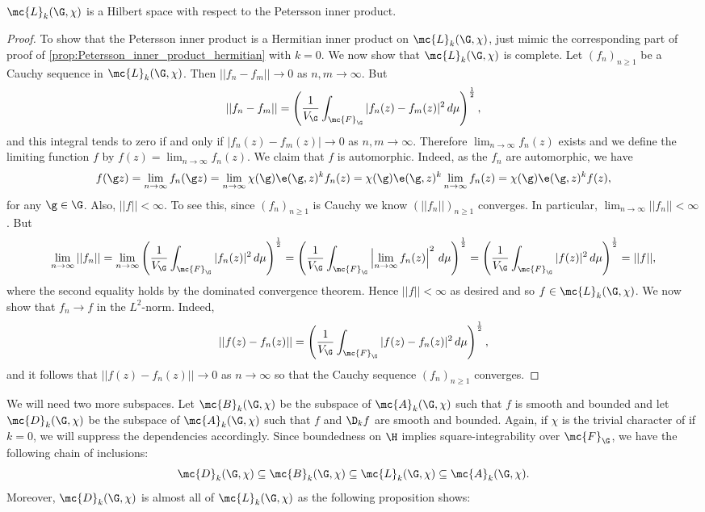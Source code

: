     \begin{proposition}
      $\mc{L}_{k}(\G,\chi)$ is a Hilbert space with respect to the Petersson inner product.
    \end{proposition}
    \begin{proof}
      To show that the Petersson inner product is a Hermitian inner product on $\mc{L}_{k}(\G,\chi)$, just mimic the corresponding part of proof of \cref{prop:Petersson_inner_product_hermitian} with $k = 0$. We now show that $\mc{L}_{k}(\G,\chi)$ is complete. Let $(f_{n})_{n \ge 1}$ be a Cauchy sequence in $\mc{L}_{k}(\G,\chi)$. Then $||f_{n}-f_{m}|| \to 0$ as $n,m \to \infty$. But
      \[
        ||f_{n}-f_{m}|| = \left(\frac{1}{V_{\G}}\int_{\mc{F}_{\G}}|f_{n}(z)-f_{m}(z)|^{2}\,d\mu\right)^{\frac{1}{2}},
      \]
      and this integral tends to zero if and only if $|f_{n}(z)-f_{m}(z)| \to 0$ as $n,m \to \infty$. Therefore $\lim_{n \to \infty}f_{n}(z)$ exists and we define the limiting function $f$ by $f(z) = \lim_{n \to \infty}f_{n}(z)$. We claim that $f$ is automorphic. Indeed, as the $f_{n}$ are automorphic, we have
      \[
        f(\g z) = \lim_{n \to \infty}f_{n}(\g z) = \lim_{n \to \infty}\chi(\g)\e(\g,z)^{k}f_{n}(z) = \chi(\g)\e(\g,z)^{k}\lim_{n \to \infty}f_{n}(z) = \chi(\g)\e(\g,z)^{k}f(z),
      \]
      for any $\g \in \G$. Also, $||f|| < \infty$. To see this, since $(f_{n})_{n \ge 1}$ is Cauchy we know $(||f_{n}||)_{n \ge 1}$ converges. In particular, $\lim_{n \to \infty}||f_{n}|| < \infty$. But
      \[
        \lim_{n \to \infty}||f_{n}|| = \lim_{n \to \infty}\left(\frac{1}{V_{\G}}\int_{\mc{F}_{\G}}|f_{n}(z)|^{2}\,d\mu\right)^{\frac{1}{2}} = \left(\frac{1}{V_{\G}}\int_{\mc{F}_{\G}}\left|\lim_{n \to \infty}f_{n}(z)\right|^{2}\,d\mu\right)^{\frac{1}{2}} = \left(\frac{1}{V_{\G}}\int_{\mc{F}_{\G}}|f(z)|^{2}\,d\mu\right)^{\frac{1}{2}} = ||f||,
      \]
      where the second equality holds by the dominated convergence theorem. Hence $||f|| < \infty$ as desired and so $f \in \mc{L}_{k}(\G,\chi)$. We now show that $f_{n} \to f$ in the $L^{2}$-norm. Indeed,
      \[
        ||f(z)-f_{n}(z)|| = \left(\frac{1}{V_{\G}}\int_{\mc{F}_{\G}}|f(z)-f_{n}(z)|^{2}\,d\mu\right)^{\frac{1}{2}},
      \]
      and it follows that $||f(z)-f_{n}(z)|| \to 0$ as $n \to \infty$ so that the Cauchy sequence $(f_{n})_{n \ge 1}$ converges.
    \end{proof}

    We will need two more subspaces. Let $\mc{B}_{k}(\G,\chi)$ be the subspace of $\mc{A}_{k}(\G,\chi)$ such that $f$ is smooth and bounded and let $\mc{D}_{k}(\G,\chi)$ be the subspace of $\mc{A}_{k}(\G,\chi)$ such that $f$ and $\D_{k}f$ are smooth and bounded. Again, if $\chi$ is the trivial character of if $k = 0$, we will suppress the dependencies accordingly. Since boundedness on $\H$ implies square-integrability over $\mc{F}_{\G}$, we have the following chain of inclusions:
    \[
      \mc{D}_{k}(\G,\chi) \subseteq \mc{B}_{k}(\G,\chi) \subseteq \mc{L}_{k}(\G,\chi) \subseteq \mc{A}_{k}(\G,\chi).
    \]
    Moreover, $\mc{D}_{k}(\G,\chi)$ is almost all of $\mc{L}_{k}(\G,\chi)$ as the following proposition shows:

